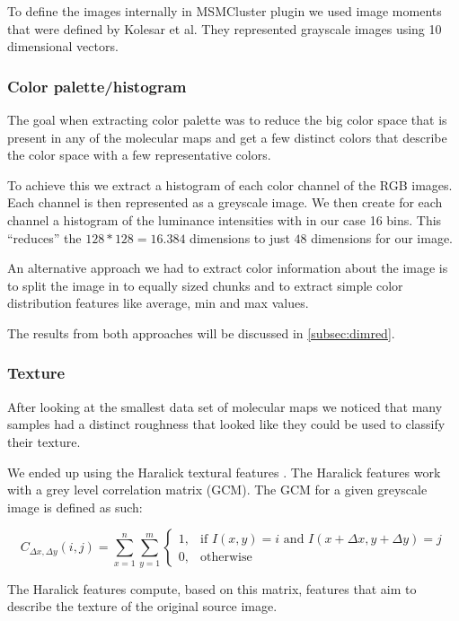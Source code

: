 \documentclass[journal]{vgtc}       %
\newcommand{\todo}[1]{\textcolor{red}{\textbf{TODO:} #1}}
\begin{document}
To define the images internally in MSMCluster plugin we used image moments that were defined by Kolesar et al. They represented grayscale images using 10 dimensional vectors. 

\subsubsection{Color palette/histogram }

The goal when extracting color palette was to reduce the big color space that is present in any of the molecular maps and get a few distinct  colors that describe the color space with a few representative colors.

To achieve this we extract a histogram of each color channel of the RGB images. Each channel is then represented as a greyscale image. We then create for each channel a histogram of the luminance intensities with in our case 16 bins. This ``reduces'' the \(128*128 = 16.384\) dimensions to just \(48\) dimensions for our image.

An alternative approach we had to extract color information about the image is to split the image in to equally sized chunks and to extract simple color distribution features like average, min and max values.

The results from both approaches will be discussed in \ref{subsec:dimred}.

\subsubsection{Texture}
After looking at the smallest data set of molecular maps we noticed that many samples had a distinct roughness that looked like they could be used to classify their texture.

We ended up using the Haralick textural features \cite{haralick}  . The Haralick features work with a grey level correlation matrix (GCM). The GCM for a given greyscale image is defined as such:

\[{\displaystyle C_{\Delta x,\Delta y}(i,j)=\sum _{x=1}^{n}\sum _{y=1}^{m}{\begin{cases}1,&{\text{if }}I(x,y)=i{\text{ and }}I(x+\Delta x,y+\Delta y)=j\\0,&{\text{otherwise}}\end{cases}}}\]

The Haralick features compute, based on this matrix, features that aim to describe the texture of the original source image.
\end{document}
